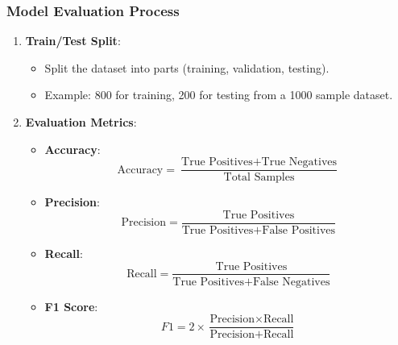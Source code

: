 \documentclass[aspectratio=169]{beamer}
\begin{document}
\begin{frame}[fragile]
    \frametitle{Model Evaluation Process}
    \begin{enumerate}
        \item \textbf{Train/Test Split}:
            \begin{itemize}
                \item Split the dataset into parts (training, validation, testing).
                \item Example: 800 for training, 200 for testing from a 1000 sample dataset.
            \end{itemize}
        \item \textbf{Evaluation Metrics}:
            \begin{itemize}
                \item \textbf{Accuracy}:
                \begin{equation}
                \text{Accuracy} = \frac{\text{True Positives} + \text{True Negatives}}{\text{Total Samples}}
                \end{equation}
                
                \item \textbf{Precision}:
                \begin{equation}
                \text{Precision} = \frac{\text{True Positives}}{\text{True Positives} + \text{False Positives}}
                \end{equation}

                \item \textbf{Recall}:
                \begin{equation}
                \text{Recall} = \frac{\text{True Positives}}{\text{True Positives} + \text{False Negatives}}
                \end{equation}

                \item \textbf{F1 Score}:
                \begin{equation}
                F1 = 2 \times \frac{\text{Precision} \times \text{Recall}}{\text{Precision} + \text{Recall}}
                \end{equation}
            \end{itemize}
    \end{enumerate}
\end{frame}
\end{document}
